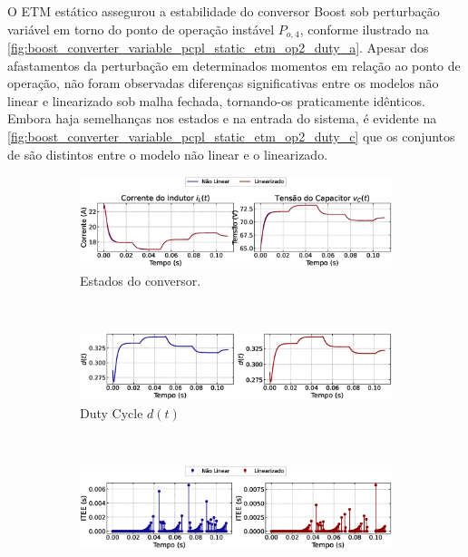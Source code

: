 O ETM estático assegurou a estabilidade do conversor Boost sob perturbação variável em torno do ponto de operação instável $P_{o, 4}$, conforme ilustrado na \autoref{fig:boost_converter_variable_pcpl_static_etm_op2_duty_a}. Apesar dos afastamentos da perturbação em determinados momentos em relação ao ponto de operação, não foram observadas diferenças significativas entre os modelos não linear e linearizado sob malha fechada, tornando-os praticamente idênticos. Embora haja semelhanças nos estados e na entrada do sistema, é evidente na \autoref{fig:boost_converter_variable_pcpl_static_etm_op2_duty_c} que os conjuntos de  são distintos entre o modelo não linear e o linearizado.

\begin{figure}[H]
  \centering
  \captionsetup{justification=centering}
  \begin{subfigure}{1.\textwidth}
    \centering
    \includegraphics[width=1.\textwidth]{figuras/static-etm/boost/sim2/op2/result.eps}
    \caption{Estados do conversor.}
    \label{fig:boost_converter_variable_pcpl_static_etm_op2_duty_a}
  \end{subfigure}
  \\[6pt]
  \begin{subfigure}{1.\textwidth}
    \centering
    \includegraphics[width=1.\textwidth]{figuras/static-etm/boost/sim2/op2/duty-cycle.eps}
    \caption{Duty Cycle $d(t)$}
    \label{fig:boost_converter_variable_pcpl_static_etm_op2_duty_b}
  \end{subfigure}
  \\[6pt]
  \begin{subfigure}{1.\textwidth}
    \centering
    \includegraphics[width=1.\textwidth]{figuras/static-etm/boost/sim2/op2/inter-event-times.eps}

\end{subfigure}
\end{figure}
